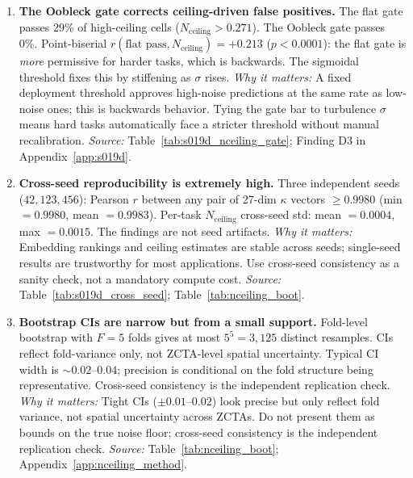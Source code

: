 \documentclass{article}
\begin{document}
\begin{enumerate}
\item \textbf{The Oobleck gate corrects ceiling-driven false positives.}
The flat gate passes 29\% of high-ceiling cells ($N_{\text{ceiling}} > 0.271$). The Oobleck gate passes 0\%. Point-biserial $r(\text{flat pass}, N_{\text{ceiling}}) = {+}0.213$ ($p < 0.0001$): the flat gate is \emph{more} permissive for harder tasks, which is backwards. The sigmoidal threshold fixes this by stiffening as $\sigma$ rises.
\emph{Why it matters:} A fixed deployment threshold approves high-noise predictions at the same rate as low-noise ones; this is backwards behavior. Tying the gate bar to turbulence $\sigma$ means hard tasks automatically face a stricter threshold without manual recalibration.
\emph{Source:} Table~\ref{tab:s019d_nceiling_gate}; Finding D3 in Appendix~\ref{app:s019d}.

\item \textbf{Cross-seed reproducibility is extremely high.}
Three independent seeds ($42, 123, 456$): Pearson $r$ between any pair of 27-dim $\kappa$ vectors $\geq 0.9980$ (min $= 0.9980$, mean $= 0.9983$). Per-task $N_{\text{ceiling}}$ cross-seed std: mean $= 0.0004$, max $= 0.0015$. The findings are not seed artifacts.
\emph{Why it matters:} Embedding rankings and ceiling estimates are stable across seeds; single-seed results are trustworthy for most applications. Use cross-seed consistency as a sanity check, not a mandatory compute cost.
\emph{Source:} Table~\ref{tab:s019d_cross_seed}; Table~\ref{tab:nceiling_boot}.

\item \textbf{Bootstrap CIs are narrow but from a small support.}
Fold-level bootstrap with $F{=}5$ folds gives at most $5^5 = 3{,}125$ distinct resamples. CIs reflect fold-variance only, not ZCTA-level spatial uncertainty. Typical CI width is ${\sim}0.02$--$0.04$; precision is conditional on the fold structure being representative. Cross-seed consistency is the independent replication check.
\emph{Why it matters:} Tight CIs (${\pm}0.01$--$0.02$) look precise but only reflect fold variance, not spatial uncertainty across ZCTAs. Do not present them as bounds on the true noise floor; cross-seed consistency is the independent replication check.
\emph{Source:} Table~\ref{tab:nceiling_boot}; Appendix~\ref{app:nceiling_method}.


\end{enumerate}
\end{document}
